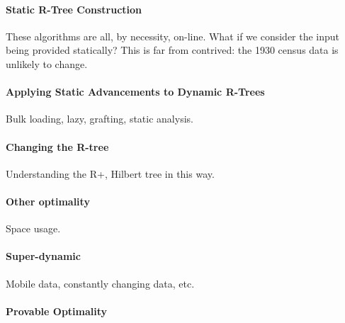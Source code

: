 \paragraph{Static R-Tree Construction}
These algorithms are all, by necessity, on-line.
What if we consider the input being provided statically?
This is far from contrived: the 1930 census data is unlikely to change.


\paragraph{Applying Static Advancements to Dynamic R-Trees}
Bulk loading, lazy, grafting, static analysis.


\paragraph{Changing the R-tree}
Understanding the R+, Hilbert tree in this way.

\paragraph{Other optimality}
Space usage.

\paragraph{Super-dynamic}
Mobile data, constantly changing data, etc.


\paragraph{Provable Optimality}



